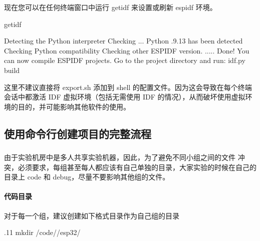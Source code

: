 \documentclass[a4paper,12pt,english]{sphinxmanual}
\begin{document}
\sphinxAtStartPar
现在您可以在任何终端窗口中运行 get\sphinxhyphen{}idf 来设置或刷新 esp\sphinxhyphen{}idf 环境。

\begin{sphinxVerbatim}[commandchars=\\\{\}]
get\PYGZhy{}idf

Detecting the Python interpreter
Checking  ...
Python .9.13
 has been detected
Checking Python compatibility
Checking other ESP\PYGZhy{}IDF version.
.....
Done! You can now compile ESP\PYGZhy{}IDF projects.
Go to the project directory and run:
idf.py build
\end{sphinxVerbatim}

\sphinxAtStartPar
这里不建议直接将 export.sh 添加到 shell 的配置文件。因为这会导致在每个终端会话中都激活 IDF 虚拟环境（包括无需使用 IDF 的情况），从而破坏使用虚拟环境的目的，并可能影响其他软件的使用。

\sphinxstepscope


\subsection{使用命令行创建项目的完整流程}
\label{\detokenize{exp-esp32/ide/esp-idf-cli:id1}}\label{\detokenize{exp-esp32/ide/esp-idf-cli::doc}}

\subsubsection{}
\label{\detokenize{exp-esp32/ide/esp-idf-cli:id2}}
\sphinxAtStartPar
由于实验机房中是多人共享实验机器，因此，为了避免不同小组之间的文件 冲突，必须要求，每组甚至每人都应该有自己单独的目录，大家实验的时候在自己的目录上 code 和 debug，尽量不要影响其他组的文件。


\paragraph{代码目录}
\label{\detokenize{exp-esp32/ide/esp-idf-cli:id3}}
\sphinxAtStartPar
对于每一个组，建议创建如下格式目录作为自己组的目录

\begin{sphinxVerbatim}[commandchars=\\\{\}]
 .11 
mkdir \PYGZti{}/code//esp32/
\end{sphinxVerbatim}
\end{document}
